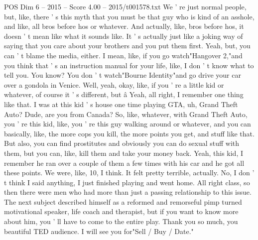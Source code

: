 \begin{textsample}{POS Dim 6 – 2015 – Score 4.00 – 2015/t001578.txt}
We ' re just normal people, but, like, there ' s this myth that you must be that guy who is kind of an asshole, and like, all bros before hos or whatever.
And actually, like, bros before hos, it doesn ' t mean like what it sounds like.
It ' s actually just like a joking way of saying that you care about your brothers and you put them first.
Yeah, but, you can ' t blame the media, either.
I mean, like, if you go watch"Hangover 2,"and you think that ' s an instruction manual for your life, like, I don ' t know what to tell you.
You know?
You don ' t watch"Bourne Identity"and go drive your car over a gondola in Venice.
Well, yeah, okay, like, if you ' re a little kid or whatever, of course it ' s different, but â Yeah, all right, I remember one thing like that.
I was at this kid ' s house one time playing GTA, uh, Grand Theft Auto?
Dude, are you from Canada?
So, like, whatever, with Grand Theft Auto, you ' re this kid, like, you ' re this guy walking around or whatever, and you can basically, like, the more cops you kill, the more points you get, and stuff like that.
But also, you can find prostitutes and obviously you can do sexual stuff with them, but you can, like, kill them and take your money back.
Yeah, this kid, I remember he ran over a couple of them a few times with his car and he got all these points.
We were, like, 10, I think.
It felt pretty terrible, actually.
No, I don ' t think I said anything, I just finished playing and went home.
All right class, so then there were men who had more than just a passing relationship to this issue.
The next subject described himself as a reformed and remorseful pimp turned motivational speaker, life coach and therapist, but if you want to know more about him, you ' ll have to come to the entire play.
Thank you so much, you beautiful TED audience.
I will see you for"Sell / Buy / Date."

\end{textsample}

